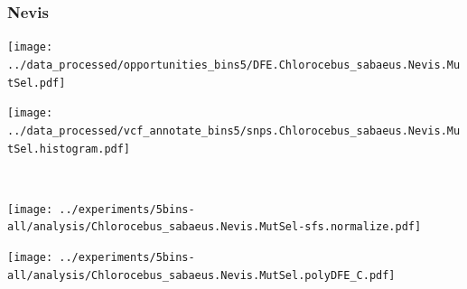\subsubsection{Nevis}

\begin{minipage}{0.49\linewidth}
    \texttt{[image: ../data\_processed/opportunities\_bins5/DFE.Chlorocebus\_sabaeus.Nevis.MutSel.pdf]}
\end{minipage}
\begin{minipage}{0.49\linewidth}
    \texttt{[image: ../data\_processed/vcf\_annotate\_bins5/snps.Chlorocebus\_sabaeus.Nevis.MutSel.histogram.pdf]}
\end{minipage}
\\
\begin{minipage}{0.49\linewidth}
    \texttt{[image: ../experiments/5bins-all/analysis/Chlorocebus\_sabaeus.Nevis.MutSel-sfs.normalize.pdf]}
\end{minipage}
\begin{minipage}{0.4\linewidth}
    \texttt{[image: ../experiments/5bins-all/analysis/Chlorocebus\_sabaeus.Nevis.MutSel.polyDFE\_C.pdf]}
\end{minipage}

